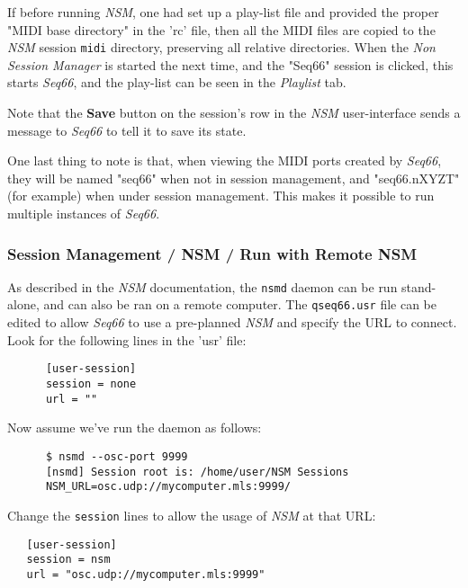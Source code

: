    If before running \textsl{NSM},
   one had set up a play-list file and provided the proper "MIDI
   base directory" in the 'rc' file, then all the MIDI files are copied to
   the \textsl{NSM} session \texttt{midi} directory,
   preserving all relative directories.
   When the \textsl{Non Session Manager} is started the next time, and the
   "Seq66" session is clicked, this starts \textsl{Seq66}, and the play-list can
   be seen in the \textsl{Playlist} tab.

   Note that the \textbf{Save} button on the session's row in the
   \textsl{NSM} user-interface sends a message to \textsl{Seq66}
   to tell it to save its state.

   One last thing to note is that, when viewing the MIDI ports created by
   \textsl{Seq66}, they will be named "seq66" when not in session management,
   and "seq66.nXYZT" (for example) when under session management.  This makes
   it possible to run multiple instances of \textsl{Seq66}.

\subsubsection{Session Management / NSM / Run with Remote NSM}
\label{subsec:sessions_nsm_before_using_nsm}

   As described in the \textsl{NSM} documentation, the \texttt{nsmd} daemon can
   be run stand-alone, and can also be ran on a remote computer.
   The \texttt{qseq66.usr} file can be edited to allow \textsl{Seq66} to
   use a pre-planned \textsl{NSM} and specify the URL to connect.
   Look for the following lines in the 'usr' file:

   \begin{verbatim}
      [user-session]
      session = none
      url = ""
   \end{verbatim}

   Now assume we've run the daemon as follows:

   \begin{verbatim}
      $ nsmd --osc-port 9999
      [nsmd] Session root is: /home/user/NSM Sessions
      NSM_URL=osc.udp://mycomputer.mls:9999/
   \end{verbatim}

   Change the \texttt{session} lines to allow the usage of
   \textsl{NSM} at that URL:

\begin{verbatim}
   [user-session]
   session = nsm
   url = "osc.udp://mycomputer.mls:9999"
\end{verbatim}

